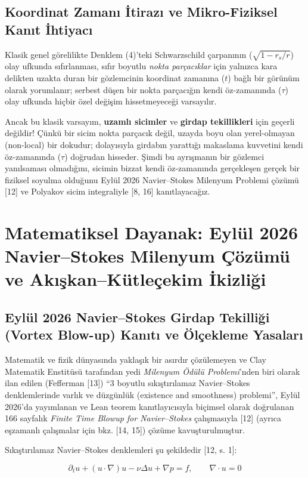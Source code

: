 \documentclass[12pt,a4paper]{article}
\begin{document}
\subsection{Koordinat Zamanı İtirazı ve Mikro-Fiziksel Kanıt İhtiyacı}

Klasik genel görelilikte Denklem (4)'teki Schwarzschild çarpanının ($\sqrt{1 - r_s/r}$) olay ufkunda sıfırlanması, sıfır boyutlu \textit{nokta parçacıklar} için yalnızca kara delikten uzakta duran bir gözlemcinin koordinat zamanına ($t$) bağlı bir görünüm olarak yorumlanır; serbest düşen bir nokta parçacığın kendi öz-zamanında ($\tau$) olay ufkunda hiçbir özel değişim hissetmeyeceği varsayılır.

Ancak bu klasik varsayım, \textbf{uzamlı sicimler} ve \textbf{girdap tekillikleri} için geçerli değildir! Çünkü bir sicim nokta parçacık değil, uzayda boyu olan yerel-olmayan (non-local) bir dokudur; dolayısıyla girdabın yarattığı makaslama kuvvetini kendi öz-zamanında ($\tau$) doğrudan hisseder. Şimdi bu ayrışmanın bir gözlemci yanılsaması olmadığını, sicimin bizzat kendi öz-zamanında gerçekleşen gerçek bir fiziksel soyulma olduğunu Eylül 2026 Navier--Stokes Milenyum Problemi çözümü [12] ve Polyakov sicim integraliyle [8, 16] kanıtlayacağız.

\section{Matematiksel Dayanak: Eylül 2026 Navier--Stokes Milenyum Çözümü ve Akışkan--Kütleçekim İkizliği}

\subsection{Eylül 2026 Navier--Stokes Girdap Tekilliği (Vortex Blow-up) Kanıtı ve Ölçekleme Yasaları}

Matematik ve fizik dünyasında yaklaşık bir asırdır çözülemeyen ve Clay Matematik Enstitüsü tarafından yedi \textit{Milenyum Ödülü Problemi}'nden biri olarak ilan edilen (Fefferman [13]) ``3 boyutlu sıkıştırılamaz Navier--Stokes denklemlerinde varlık ve düzgünlük (existence and smoothness) problemi'', Eylül 2026'da yayımlanan ve Lean teorem kanıtlayıcısıyla biçimsel olarak doğrulanan 166 sayfalık \textit{Finite Time Blowup for Navier--Stokes} çalışmasıyla [12] (ayrıca eşzamanlı çalışmalar için bkz. [14, 15]) çözüme kavuşturulmuştur.

Sıkıştırılamaz Navier--Stokes denklemleri şu şekildedir [12, s. 1]:

\begin{equation}
\partial_t u + (u \cdot \nabla)u - \nu \Delta u + \nabla p = f, \qquad \nabla \cdot u = 0
\end{equation}
\end{document}
